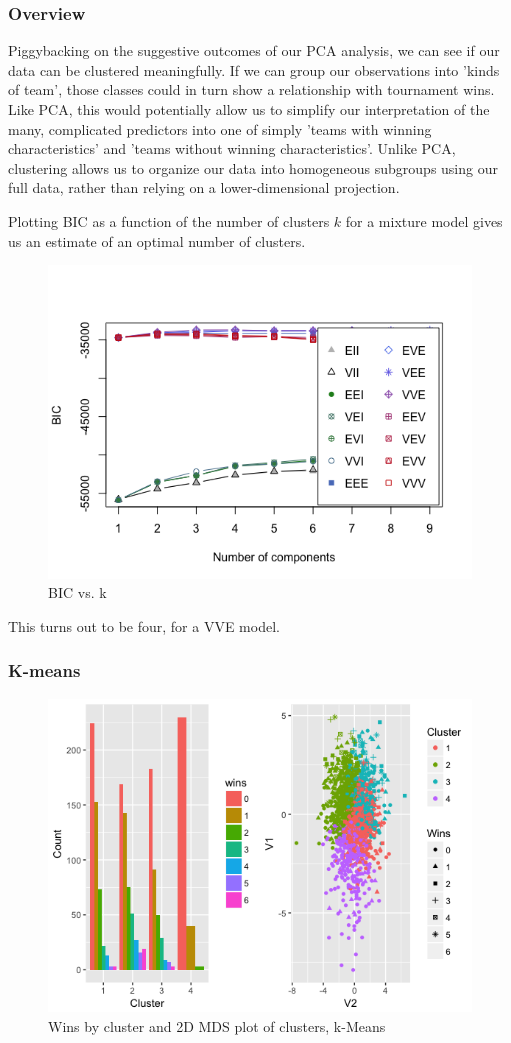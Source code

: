 \documentclass[10pt,a4paper, hidelinks]{article} %
\begin{document}
\subsubsection{Overview}
Piggybacking on the suggestive outcomes of our PCA analysis, we can see if our data can be clustered meaningfully.  If we can group our observations into 'kinds of team', those classes could in turn show a relationship with tournament wins.  Like PCA, this would potentially allow us to simplify our interpretation of the many, complicated predictors into one of simply 'teams with winning characteristics' and 'teams without winning characteristics'.  Unlike PCA, clustering allows us to organize our data into homogeneous subgroups using our full data, rather than relying on a lower-dimensional projection.

Plotting BIC as a function of the number of clusters $k$ for a mixture model gives us an estimate of an optimal number of clusters.

\begin{figure}[H]
	\centering
	\includegraphics[width=0.7\linewidth]{../fig/sonofaBIC}
				\caption{BIC vs. k}
\end{figure}

This turns out to be four, for a VVE model.

\subsubsection{K-means}

\begin{figure}[H]
	\centering
	\includegraphics[width=0.7\linewidth]{../fig/clusterfun}
			\caption{Wins by cluster and 2D MDS plot of clusters, k-Means}
\end{figure}
\end{document}
